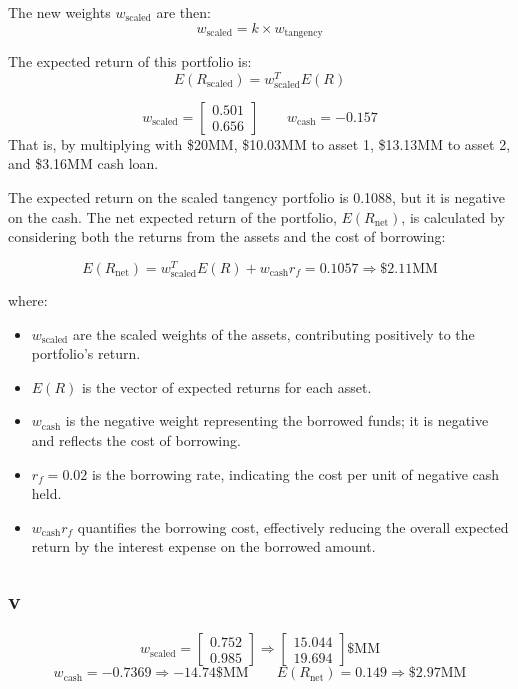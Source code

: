 \documentclass{article}
\begin{document}
The new weights \( w_{\text{scaled}} \) are then:
\[ w_{\text{scaled}} = k \times w_{\text{tangency}} \]

The expected return of this portfolio is:
\[ E(R_{\text{scaled}}) = w_{\text{scaled}}^T E(R) \]

$$\displaystyle w_\text{scaled} = \left[\begin{matrix}0.501\\0.656\end{matrix}\right]\qquad w_\text{cash} = -0.157$$
That is, by multiplying with \$20MM, \$10.03MM to asset 1, \$13.13MM to asset 2, and \$3.16MM cash loan.

The expected return on the scaled tangency portfolio is 0.1088, but it is negative on the cash.
The net expected return of the portfolio,
\( E(R_{\text{net}}) \), is calculated by considering both the returns from the assets and the cost of borrowing:

\[ E(R_{\text{net}}) = w_{\text{scaled}}^T E(R) + w_{\text{cash}} r_f = 0.1057 \Rightarrow \$2.11\text{MM}\]

where:
\begin{itemize}
    \item \( w_{\text{scaled}} \) are the scaled weights of the assets,
          contributing positively to the portfolio's return.
    \item \( E(R) \) is the vector of expected returns for each asset.
    \item \( w_{\text{cash}} \) is the negative weight representing the borrowed funds;
          it is negative and reflects the cost of borrowing.
    \item \( r_f =0.02\) is the borrowing rate, indicating the cost per unit of negative cash held.
    \item \( w_{\text{cash}} r_f \) quantifies the borrowing cost,
          effectively reducing the overall expected return by the interest expense on the borrowed amount.
\end{itemize}
\subsection*{v}
$$\displaystyle w_\text{scaled} = \left[\begin{matrix}0.752\\0.985\end{matrix}\right] \Rightarrow \left[\begin{matrix}15.044\\19.694\end{matrix}\right] \text{\$MM}$$
$$w_\text{cash} = -0.7369 \Rightarrow -14.74 \$\text{MM}\qquad E(R_{\text{net}}) = 0.149 \Rightarrow \$2.97\text{MM}$$
\end{document}
